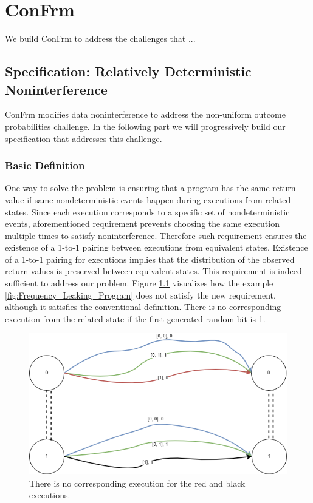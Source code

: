 
\chapter{ConFrm}
We build ConFrm to address the challenges that ...


\section{Specification: Relatively Deterministic Noninterference}
ConFrm modifies data noninterference to address the non-uniform outcome probabilities challenge. In the following part we will progressively build our specification that addresses this challenge. 

\subsection{Basic Definition}
One way to solve the problem is ensuring that a program has the same return value if  same nondeterministic events happen during executions from related states. Since each execution corresponds to a specific set of nondeterministic events, aforementioned requirement prevents choosing the same execution multiple times to satisfy noninterference. Therefore such requirement ensures the existence of a 1-to-1 pairing between executions from equivalent states. Existence of a 1-to-1 pairing for executions implies that the distribution of the observed return values is preserved between equivalent states. This requirement is indeed sufficient to address our problem. Figure \ref{fig:RDNI_Matching_Paths} visualizes how the example \ref{fig:Frequency_Leaking_Program} does not satisfy the new requirement, although it satisfies the conventional definition. There is no corresponding execution from the related state if the first generated random bit is 1.

\begin{figure}[h]
    \centering
    \includegraphics[scale=0.5]{templates/figures/matching-paths-rdni.png}
    \caption{There is no corresponding execution for the red and black executions.}
    \label{fig:RDNI_Matching_Paths}
\end{figure}

